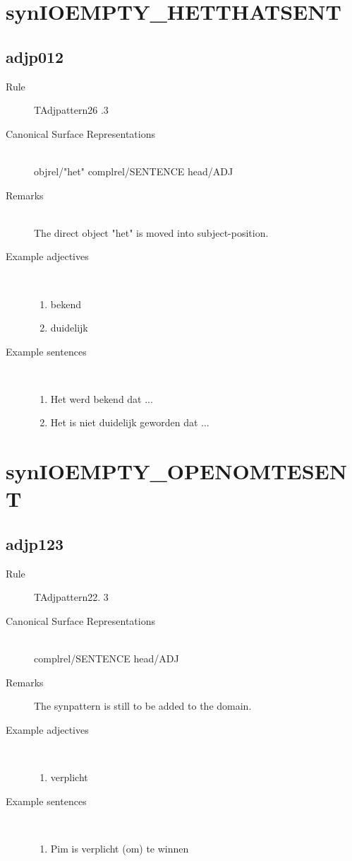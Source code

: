\section{synIOEMPTY\_HETTHATSENT}
  \subsection{adjp012}
\begin{description}
  \item [Rule] TAdjpattern26 .3
  \item [Canonical Surface Representations]  \mbox{}\\ 
objrel/"het" complrel/SENTENCE head/ADJ
  \item [Remarks] \mbox{}\\
The direct object "het" is moved into subject-position.
  \item [Example adjectives]\mbox{}\\
\begin{enumerate}
  \item bekend
  \item duidelijk
\end{enumerate}
  \item [Example sentences]\mbox{}\\
\begin{enumerate}
  \item Het werd bekend dat ... 
  \item Het is niet duidelijk geworden dat ...
\end{enumerate}
\end{description}
\newpage
\section{synIOEMPTY\_OPENOMTESENT}
\subsection{adjp123}
\begin{description}
  \item [Rule] TAdjpattern22. 3
  \item [Canonical Surface Representations] \mbox{}\\ 
complrel/SENTENCE head/ADJ
  \item [Remarks] The synpattern is still to be added to the domain.

  \item [Example adjectives]\mbox{}\\
\begin{enumerate}
  \item verplicht
\end{enumerate}
  \item [Example sentences]\mbox{}\\
\begin{enumerate}
  \item Pim is verplicht (om) te winnen
\end{enumerate}
\end{description}
\newpage
